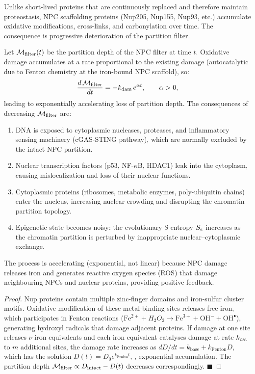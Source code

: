 Unlike short-lived proteins that are continuously replaced and therefore
maintain proteostasis, NPC scaffolding proteins (Nup205, Nup155, Nup93, etc.)
accumulate oxidative modifications, cross-links, and carbonylation over time.
The consequence is progressive deterioration of the partition filter.

\begin{theorem}
\label{thm:aging_npc}
Let $\mathcal{M}_{\mathrm{filter}}(t)$ be the partition depth of the NPC filter at
time $t$. Oxidative damage accumulates at a rate proportional to the existing
damage (autocatalytic due to Fenton chemistry at the iron-bound NPC scaffold),
so:
\begin{equation}
  \frac{d\,\mathcal{M}_{\mathrm{filter}}}{dt} = -k_{\mathrm{dam}}\,e^{\alpha t},
  \qquad \alpha > 0,
  \label{eq:npc_damage}
\end{equation}
leading to exponentially accelerating loss of partition depth. The
consequences of decreasing $\mathcal{M}_{\mathrm{filter}}$ are:
\begin{enumerate}[label=(\roman*)]
  \item DNA is exposed to cytoplasmic nucleases, proteases, and inflammatory
        sensing machinery (cGAS-STING pathway), which are normally excluded by
        the intact NPC partition.
  \item Nuclear transcription factors (p53, NF-$\kappa$B, HDAC1) leak into the
        cytoplasm, causing mislocalization and loss of their nuclear functions.
  \item Cytoplasmic proteins (ribosomes, metabolic enzymes, poly-ubiquitin
        chains) enter the nucleus, increasing nuclear crowding and disrupting
        the chromatin partition topology.
  \item Epigenetic state becomes noisy: the evolutionary S-entropy $S_e$
        increases as the chromatin partition is perturbed by inappropriate
        nuclear--cytoplasmic exchange.
\end{enumerate}
The process is accelerating (exponential, not linear) because NPC damage
releases iron and generates reactive oxygen species (ROS) that damage
neighbouring NPCs and nuclear proteins, providing positive feedback.
\end{theorem}

\begin{proof}
Nup proteins contain multiple zinc-finger domains and iron-sulfur cluster
motifs. Oxidative modification of these metal-binding sites releases free iron,
which participates in Fenton reactions ($\text{Fe}^{2+} + H_2O_2 \to
\text{Fe}^{3+} + \text{OH}^- + \text{OH}^\bullet$), generating hydroxyl
radicals that damage adjacent proteins. If damage at one site releases $\nu$
iron equivalents and each iron equivalent catalyses damage at rate $k_{\rm cat}$
to $m$ additional sites, the damage rate increases as
$dD/dt = k_{\mathrm{base}} + k_{\mathrm{Fenton}} D$, which has the solution
$D(t) = D_0 e^{k_{\mathrm{Fenton}}t}$, \ie, exponential accumulation.
The partition depth $\mathcal{M}_{\mathrm{filter}} \propto D_{\rm intact} - D(t)$
decreases correspondingly. $\blacksquare$
\end{proof}

